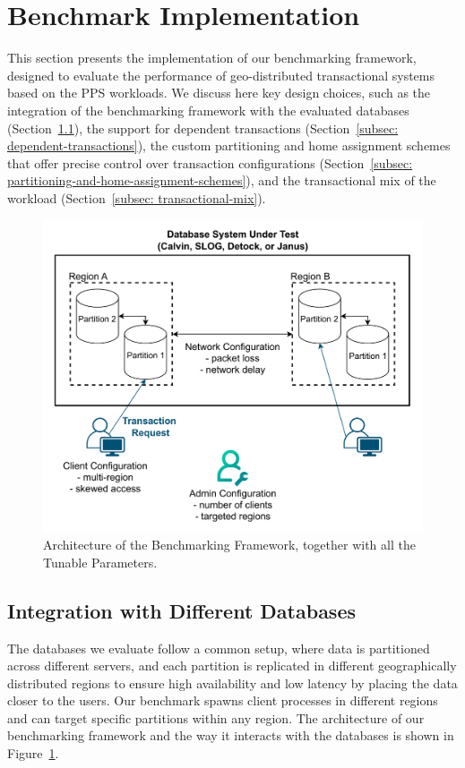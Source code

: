\section{Benchmark Implementation}
\label{sec: benchmark-implementation}
This section presents the implementation of our benchmarking framework, designed to evaluate the performance of geo-distributed transactional systems based on the PPS workloads. We discuss here key design choices, such as the integration of the benchmarking framework with the evaluated databases (Section~\ref{subsec: integration-with-different-databases}), the support for dependent transactions (Section~\ref{subsec: dependent-transactions}), the custom partitioning and home assignment schemes that offer precise control over transaction configurations (Section~\ref{subsec: partitioning-and-home-assignment-schemes}), and the transactional mix of the workload (Section~\ref{subsec: transactional-mix}).

\begin{figure}[ht]
    \centering
    \includegraphics[width=1\linewidth]{figures/Overall Architecture.pdf}
    \caption{Architecture of the Benchmarking Framework, together with all the Tunable Parameters.}
    \label{fig: overall-architecture}
\end{figure}

\subsection{Integration with Different Databases}
\label{subsec: integration-with-different-databases}
The databases we evaluate follow a common setup, where data is partitioned across different servers, and each partition is replicated in different geographically distributed regions to ensure high availability and low latency by placing the data closer to the users. Our benchmark spawns client processes in different regions and can target specific partitions within any region. The architecture of our benchmarking framework and the way it interacts with the databases is shown in Figure~\ref{fig: overall-architecture}.

